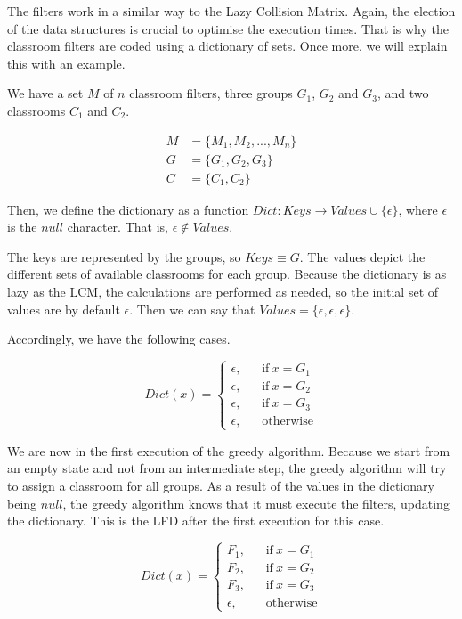 The filters work in a similar way to the Lazy Collision Matrix. Again, the election of the data structures is crucial to optimise the execution times. That is why the classroom filters are coded using a dictionary of sets. Once more, we will explain this with an example.

We have a set $M$ of $n$ classroom filters, three groups $G_{1}$, $G_{2}$ and $G_{3}$, and two classrooms $C_{1}$ and $C_{2}$.

\begin{align}
    M &= \{ M_{1}, M_{2}, ..., M_{n} \}\\
    G &= \{ G_{1}, G_{2}, G_{3} \}\\
    C &= \{ C_{1}, C_{2} \}
\end{align}

Then, we define the dictionary as a function $Dict: Keys \rightarrow Values \cup \{ \epsilon \}$, where $\epsilon$ is the $null$ character. That is, $\epsilon \notin Values$.

The keys are represented by the groups, so $Keys \equiv G$. The values depict the different sets of available classrooms for each group. Because the dictionary is as lazy as the LCM, the calculations are performed as needed, so the initial set of values are by default $\epsilon$. Then we can say that $Values = \{ \epsilon, \epsilon, \epsilon \}$.

Accordingly, we have the following cases.

\[
    Dict(x) =
    \begin{cases}
        \epsilon\text{,} &\quad\text{if}\ x = G_{1}\\
        \epsilon\text{,} &\quad\text{if}\ x = G_{2}\\
        \epsilon\text{,} &\quad\text{if}\ x = G_{3}\\
        \epsilon\text{,} &\quad\text{otherwise}
    \end{cases}
\]

We are now in the first execution of the greedy algorithm. Because we start from an empty state and not from an intermediate step, the greedy algorithm will try to assign a classroom for all groups. As a result of the values in the dictionary being $null$, the greedy algorithm knows that it must execute the filters, updating the dictionary. This is the LFD after the first execution for this case.

\[
    Dict(x) =
    \begin{cases}
        F_{1}\text{,} &\quad\text{if}\ x = G_{1}\\
        F_{2}\text{,} &\quad\text{if}\ x = G_{2}\\
        F_{3}\text{,} &\quad\text{if}\ x = G_{3}\\
        \epsilon\text{,} &\quad\text{otherwise}
    \end{cases}
\]

